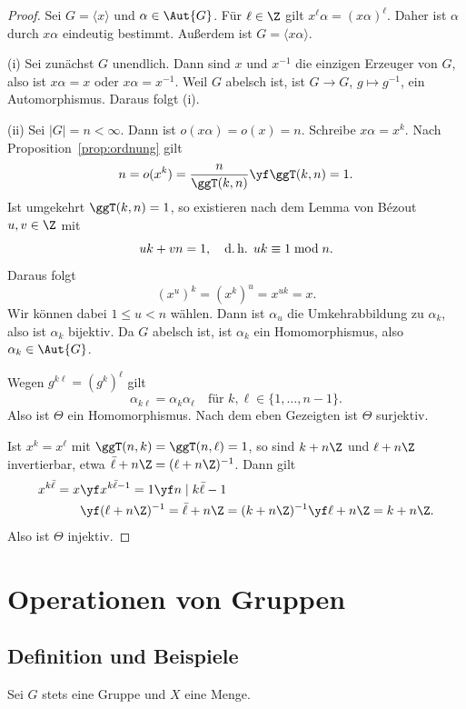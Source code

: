 \documentclass[11pt]{article}
\begin{document}
\begin{proof}
  Sei $G = \langle x \rangle$ und $\alpha \in \Aut{G}$. Für $\ell \in \Z$ gilt $x^\ell \alpha = (x\alpha)^\ell$. Daher ist $\alpha$ durch $x\alpha$ eindeutig bestimmt. Außerdem ist $G = \langle x\alpha \rangle$.

  (i) Sei zunächst $G$ unendlich. Dann sind $x$ und $x^{-1}$ die einzigen Erzeuger von $G$, also ist $x\alpha = x$ oder $x\alpha = x^{-1}$. Weil $G$ abelsch ist, ist $G \to G$, $g \mapsto g^{-1}$, ein Automorphismus. Daraus folgt (i).

  (ii) Sei $\lvert G \rvert = n < \infty$. Dann ist $o(x\alpha) = o(x) = n$. Schreibe $x\alpha = x^k$. Nach Proposition~\ref{prop:ordnung} gilt
  \[ n = o(x^k) = \frac{n}{\ggT(k, n)} \yf \ggT(k, n) = 1. \]
  Ist umgekehrt $\ggT(k, n) = 1$, so existieren nach dem Lemma von Bézout $u, v \in \Z$ mit
  \[ uk + vn = 1, \quad \text{d.\,h. } uk \equiv 1 \bmod n. \]
  Daraus folgt
  \[ (x^u)^k = (x^k)^u = x^{uk} = x. \]
  Wir können dabei $1 \le u < n$ wählen. Dann ist $\alpha_u$ die Umkehrabbildung zu $\alpha_k$, also ist $\alpha_k$ bijektiv. Da $G$ abelsch ist, ist $\alpha_k$ ein Homomorphismus, also $\alpha_k \in \Aut{G}$.


  Wegen $g^{k\ell} = (g^k)^\ell$ gilt
  \[ \alpha_{k\ell} = \alpha_k \alpha_\ell \quad \text{für } k, \ell \in \{1, \dots, n-1\}. \]
  Also ist $\Theta$ ein Homomorphismus. Nach dem eben Gezeigten ist $\Theta$ surjektiv.

  Ist $x^k = x^\ell$ mit $\ggT(n, k) = \ggT(n, \ell) = 1$, so sind $k + n\Z$ und $\ell + n\Z$ invertierbar, etwa $\bar\ell + n\Z = (\ell + n\Z)^{-1}$. Dann gilt
  \begin{align*}
    x^{k\bar\ell} = x &\yf x^{k\bar\ell - 1} = 1 \yf n \mid k\bar\ell - 1 \\
    &\yf (\ell + n\Z)^{-1} = \bar\ell + n\Z = (k + n\Z)^{-1} \yf \ell + n\Z = k + n\Z.
  \end{align*}
  Also ist $\Theta$ injektiv.
\end{proof}

\section{Operationen von Gruppen}

\subsection{Definition und Beispiele}

Sei $G$ stets eine Gruppe und $X$ eine Menge.
\end{document}
